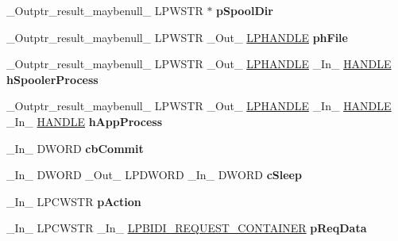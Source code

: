 \begin{DoxyCompactItemize}
\+\_\+\+Outptr\+\_\+result\+\_\+maybenull\+\_\+ L\+P\+W\+S\+TR $\ast$ {\bfseries p\+Spool\+Dir}
\item 
\mbox{\label{struct___p_r_i_n_t_p_r_o_v_i_d_o_r_aeb8b40385dc9765be15d0fe9d2be4784}} 
\+\_\+\+Outptr\+\_\+result\+\_\+maybenull\+\_\+ L\+P\+W\+S\+TR \+\_\+\+Out\+\_\+ \hyperlink{interfacevoid}{L\+P\+H\+A\+N\+D\+LE} {\bfseries ph\+File}
\item 
\mbox{\label{struct___p_r_i_n_t_p_r_o_v_i_d_o_r_aa4f4659e92569be75d53888900a3d84c}} 
\+\_\+\+Outptr\+\_\+result\+\_\+maybenull\+\_\+ L\+P\+W\+S\+TR \+\_\+\+Out\+\_\+ \hyperlink{interfacevoid}{L\+P\+H\+A\+N\+D\+LE} \+\_\+\+In\+\_\+ \hyperlink{interfacevoid}{H\+A\+N\+D\+LE} {\bfseries h\+Spooler\+Process}
\item 
\mbox{\label{struct___p_r_i_n_t_p_r_o_v_i_d_o_r_ac6d132a2a14d31f48673402a5d25f752}} 
\+\_\+\+Outptr\+\_\+result\+\_\+maybenull\+\_\+ L\+P\+W\+S\+TR \+\_\+\+Out\+\_\+ \hyperlink{interfacevoid}{L\+P\+H\+A\+N\+D\+LE} \+\_\+\+In\+\_\+ \hyperlink{interfacevoid}{H\+A\+N\+D\+LE} \+\_\+\+In\+\_\+ \hyperlink{interfacevoid}{H\+A\+N\+D\+LE} {\bfseries h\+App\+Process}
\item 
\mbox{\label{struct___p_r_i_n_t_p_r_o_v_i_d_o_r_ac4230538fb5dc9e44449c06ee80a2033}} 
\+\_\+\+In\+\_\+ D\+W\+O\+RD {\bfseries cb\+Commit}
\item 
\mbox{\label{struct___p_r_i_n_t_p_r_o_v_i_d_o_r_a2d6dd361c6ccd8fcaf502bb6611b98f6}} 
\+\_\+\+In\+\_\+ D\+W\+O\+RD \+\_\+\+Out\+\_\+ L\+P\+D\+W\+O\+RD \+\_\+\+In\+\_\+ D\+W\+O\+RD {\bfseries c\+Sleep}
\item 
\mbox{\label{struct___p_r_i_n_t_p_r_o_v_i_d_o_r_a69af383ba45c7cbf13e8f5c1ac7e94bf}} 
\+\_\+\+In\+\_\+ L\+P\+C\+W\+S\+TR {\bfseries p\+Action}
\item 
\mbox{\label{struct___p_r_i_n_t_p_r_o_v_i_d_o_r_a23d3a19df803287755a2cd57c807af12}} 
\+\_\+\+In\+\_\+ L\+P\+C\+W\+S\+TR \+\_\+\+In\+\_\+ \hyperlink{struct___b_i_d_i___r_e_q_u_e_s_t___c_o_n_t_a_i_n_e_r}{L\+P\+B\+I\+D\+I\+\_\+\+R\+E\+Q\+U\+E\+S\+T\+\_\+\+C\+O\+N\+T\+A\+I\+N\+ER} {\bfseries p\+Req\+Data}

\end{DoxyCompactItemize}
